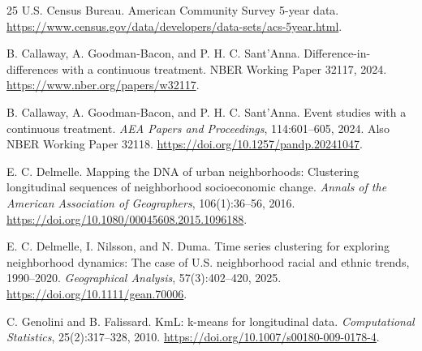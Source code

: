 \documentclass[11pt]{article}
\begin{document}
\begin{thebibliography}{25}
U.S. Census Bureau.
\newblock American Community Survey 5-year data.
\newblock \url{https://www.census.gov/data/developers/data-sets/acs-5year.html}.

B. Callaway, A. Goodman-Bacon, and P. H. C. Sant'Anna.
\newblock Difference-in-differences with a continuous treatment.
\newblock NBER Working Paper 32117, 2024.
\newblock \url{https://www.nber.org/papers/w32117}.

B. Callaway, A. Goodman-Bacon, and P. H. C. Sant'Anna.
\newblock Event studies with a continuous treatment.
\newblock \emph{AEA Papers and Proceedings}, 114:601--605, 2024. Also NBER Working Paper 32118.
\newblock \url{https://doi.org/10.1257/pandp.20241047}.

E. C. Delmelle.
\newblock Mapping the DNA of urban neighborhoods: Clustering longitudinal sequences of neighborhood socioeconomic change.
\newblock \emph{Annals of the American Association of Geographers}, 106(1):36--56, 2016.
\newblock \url{https://doi.org/10.1080/00045608.2015.1096188}.

E. C. Delmelle, I. Nilsson, and N. Duma.
\newblock Time series clustering for exploring neighborhood dynamics: The case of U.S. neighborhood racial and ethnic trends, 1990--2020.
\newblock \emph{Geographical Analysis}, 57(3):402--420, 2025.
\newblock \url{https://doi.org/10.1111/gean.70006}.

C. Genolini and B. Falissard.
\newblock KmL: k-means for longitudinal data.
\newblock \emph{Computational Statistics}, 25(2):317--328, 2010.
\newblock \url{https://doi.org/10.1007/s00180-009-0178-4}.

\end{thebibliography}
\end{document}
